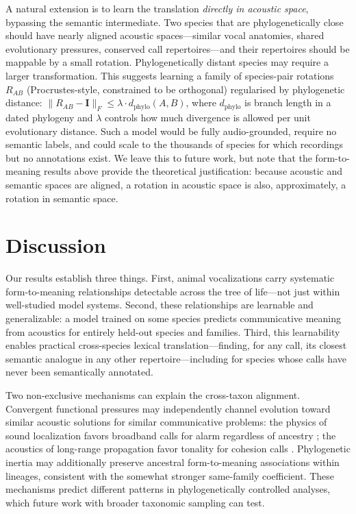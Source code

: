 \documentclass[external]{esp-paper}
\begin{document}
A natural extension is to learn the translation \emph{directly in acoustic space}, bypassing the semantic intermediate. Two species that are phylogenetically close should have nearly aligned acoustic spaces---similar vocal anatomies, shared evolutionary pressures, conserved call repertoires---and their repertoires should be mappable by a small rotation. Phylogenetically distant species may require a larger transformation. This suggests learning a family of species-pair rotations $R_{AB}$ (Procrustes-style, constrained to be orthogonal) regularised by phylogenetic distance: $\|R_{AB} - \mathbf{I}\|_F \leq \lambda \cdot d_{\mathrm{phylo}}(A,B)$, where $d_{\mathrm{phylo}}$ is branch length in a dated phylogeny and $\lambda$ controls how much divergence is allowed per unit evolutionary distance. Such a model would be fully audio-grounded, require no semantic labels, and could scale to the thousands of species for which recordings but no annotations exist. We leave this to future work, but note that the form-to-meaning results above provide the theoretical justification: because acoustic and semantic spaces are aligned, a rotation in acoustic space is also, approximately, a rotation in semantic space.

\section{Discussion}

Our results establish three things. First, animal vocalizations carry systematic form-to-meaning relationships detectable across the tree of life---not just within well-studied model systems. Second, these relationships are learnable and generalizable: a model trained on some species predicts communicative meaning from acoustics for entirely held-out species and families. Third, this learnability enables practical cross-species lexical translation---finding, for any call, its closest semantic analogue in any other repertoire---including for species whose calls have never been semantically annotated.

Two non-exclusive mechanisms can explain the cross-taxon alignment. Convergent functional pressures may independently channel evolution toward similar acoustic solutions for similar communicative problems: the physics of sound localization favors broadband calls for alarm regardless of ancestry \cite{marler1955characteristics}; the acoustics of long-range propagation favor tonality for cohesion calls \cite{morton1977on}. Phylogenetic inertia may additionally preserve ancestral form-to-meaning associations within lineages, consistent with the somewhat stronger same-family coefficient. These mechanisms predict different patterns in phylogenetically controlled analyses, which future work with broader taxonomic sampling can test.
\end{document}
